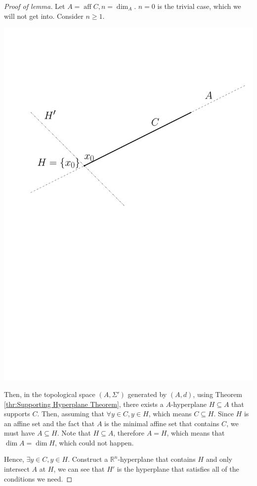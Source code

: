   \begin{proof}[Proof of lemma]
    Let \( A = \operatorname{aff} C, n = \dim_A \). \( n = 0 \) is
    the trivial case, which we will not get into. Consider \( n \ge  1 \).
    
    \includegraphics[scale=0.5]{figures/1696827875}

    Then, in the topological space \( (A, \Sigma') \) generated by \( (A, d) \),
    using Theorem \ref{thr:Supporting Hyperplane Theorem}, there exists a
    \( A \)-hyperplane \( H \subseteq A \) that supports \( C \). Then, assuming
    that \( \forall y \in C, y \in H \), which means \( C \subseteq H \). Since
    \( H \) is an affine set and the fact that \( A \) is the minimal affine set
    that contains \( C \), we must have \( A \subseteq H \). Note that \( H
    \subseteq A \), therefore \( A = H \), which means that \(
    \dim A = \operatorname{dim} H \), which could not happen.

    Hence, \( \exists y \in C, y \in H \). Construct a \( \mathbb{R}^{n}
    \)-hyperplane that contains \( H \) and only intersect \( A \) at \( H \),
    we can see that \( H' \) is the hyperplane that satisfies all of the
    conditions we need.
  \end{proof}


